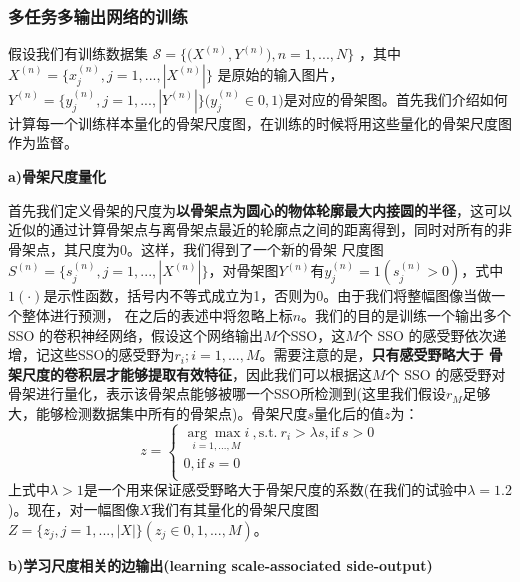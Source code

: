 \documentclass[UTF8]{ctexart}
\numberwithin{equation}{section} %
\numberwithin{table}{section} %
\begin{document}
\subsubsection{多任务多输出网络的训练}\label{sec:train_net}
假设我们有训练数据集 $\mathcal{S} = \big\{\big(X^{(n)},Y^{(n)}\big),n=1,...,N\big\}$ ，其中 $X^{(n)}=\big\{ x^{(n)}_j, j=1,...,|X^{(n)}| \big\}$ 是原始的输入图片，
$Y^{(n)}=\big\{ y^{(n)}_j, j=1,...,|Y^{(n)}| \big\}\big(y^{(n)}_j \in {0,1}\big)$是对应的骨架图。首先我们介绍如何计算每一个训练样本量化的骨架尺度图，在训练的时候将用这些量化的骨架尺度图作为监督。

\vspace{1em}
\noindent \textbf{a)骨架尺度量化}


首先我们定义骨架的尺度为\textbf{以骨架点为圆心的物体轮廓最大内接圆的半径}，这可以近似的通过计算骨架点与离骨架点最近的轮廓点之间的距离得到，同时对所有的非骨架点，其尺度为0。这样，我们得到了一个新的骨架
尺度图$S^{(n)} = \big\{s^{(n)}_j,j=1,...,|X^{(n)}|\big\}$，对骨架图$Y^{(n)}$有$y^{(n)}_j = 1(s^{(n)}_j > 0)$，式中$1(\cdot)$是示性函数，括号内不等式成立为1，否则为0。由于我们将整幅图像当做一个整体进行预测，
在之后的表述中将忽略上标$n$。我们的目的是训练一个输出多个 SSO 的卷积神经网络，假设这个网络输出$M$个SSO，这$M$个 SSO 的感受野依次递增，记这些SSO的感受野为$r_i;i=1,...,M$。需要注意的是，\textbf{只有感受野略大于
骨架尺度的卷积层才能够提取有效特征}，因此我们可以根据这$M$个 SSO 的感受野对骨架进行量化，表示该骨架点能够被哪一个SSO所检测到(这里我们假设$r_M$足够大，能够检测数据集中所有的骨架点)。骨架尺度$s$量化后的值$z$为：
\begin{equation}
z = 
\begin{cases}
\underset{i=1,...,M}{\arg\max i} \ , \text{s.t.} \ r_i > \lambda s, \text{if} \  s>0 \\
0, \text{if} \ s = 0\\
\end{cases}
\end{equation}
上式中$\lambda > 1$是一个用来保证感受野略大于骨架尺度的系数(在我们的试验中$\lambda = 1.2$)。现在，对一幅图像$X$我们有其量化的骨架尺度图$Z = \big\{z_j,j=1,...,|X|\big\}(z_j \in {0,1,...,M})$。

\vspace{1em}
\noindent \textbf{b)学习尺度相关的边输出(learning scale-associated side-output)}
\end{document}
